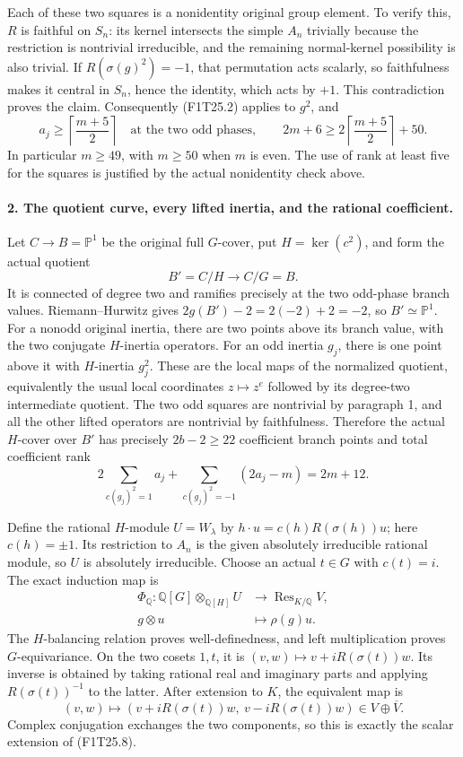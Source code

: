 Each of these two squares is a nonidentity original
group element. To verify this, $R$ is faithful on $S_n$:
its kernel intersects the simple $A_n$ trivially because
the restriction is nontrivial irreducible, and the remaining
normal-kernel possibility is also trivial. If
$R(\sigma(g)^2)=-1$, that permutation acts scalarly,
so faithfulness makes it central in $S_n$, hence the identity,
which acts by $+1$. This contradiction proves the claim.
Consequently (F1T25.2) applies to $g^2$, and
\[
  a_j\ge\left\lceil\frac{m+5}{2}\right\rceil
       \quad\text{at the two odd phases},\qquad
 2m+6\ge2\left\lceil\frac{m+5}{2}\right\rceil+50.
 \tag{F1T25.5}
\]
In particular $m\ge49$, with $m\ge50$ when $m$ is even.
The use of rank at least five for the squares is justified
by the actual nonidentity check above.

\paragraph{2. The quotient curve, every lifted inertia, and the rational coefficient.}
Let $C\to B=\mathbb P^1$ be the original full $G$-cover,
put $H=\ker(c^2)$, and form the actual quotient
\[
                   B'=C/H\longrightarrow C/G=B.
 \tag{F1T25.6}
\]
It is connected of degree two and ramifies precisely at
the two odd-phase branch values. Riemann--Hurwitz gives
$2g(B')-2=2(-2)+2=-2$, so $B'\simeq\mathbb P^1$.
For a nonodd original inertia, there are two points above
its branch value, with the two conjugate $H$-inertia
operators. For an odd inertia $g_j$, there is one point
above it with $H$-inertia $g_j^2$. These are the local
maps of the normalized quotient, equivalently the usual
local coordinates $z\mapsto z^e$ followed by its degree-two
intermediate quotient. The two odd squares are nontrivial
by paragraph 1, and all the other lifted operators are
nontrivial by faithfulness. Therefore the actual $H$-cover
over $B'$ has precisely $2b-2\ge22$ coefficient branch
points and total coefficient rank
\[
 2\sum_{c(g_j)^2=1}a_j+
       \sum_{c(g_j)^2=-1}(2a_j-m)=2m+12.
 \tag{F1T25.7}
\]

Define the rational $H$-module $U=W_\lambda$ by
$h\cdot u=c(h)R(\sigma(h))u$; here $c(h)=\pm1$.
Its restriction to $A_n$ is the given absolutely
irreducible rational module, so $U$ is absolutely
irreducible. Choose an actual $t\in G$ with $c(t)=i$.
The exact induction map is
\[
 \begin{split}
 \Phi_{\mathbb Q}:\mathbb Q[G]\otimes_{\mathbb Q[H]}U
       &\longrightarrow\operatorname{Res}_{K/\mathbb Q}V,\\
 g\otimes u&\longmapsto\rho(g)u.
 \end{split}
 \tag{F1T25.8}
\]
The $H$-balancing relation proves well-definedness, and
left multiplication proves $G$-equivariance. On the two
cosets $1,t$, it is $(v,w)\mapsto v+iR(\sigma(t))w$.
Its inverse is obtained by taking rational real and
imaginary parts and applying $R(\sigma(t))^{-1}$ to
the latter. After extension to $K$, the equivalent map is
\[
 (v,w)\longmapsto
     (v+iR(\sigma(t))w,\ v-iR(\sigma(t))w)
          \in V\oplus\overline V.
 \tag{F1T25.9}
\]
Complex conjugation exchanges the two components, so this
is exactly the scalar extension of (F1T25.8).

